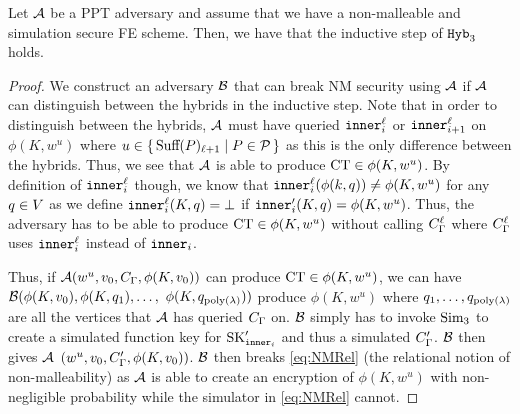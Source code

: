 \begin{lemma}
		\label{lem:NMIndep}
		Let $\mathcal{A}$ be a PPT adversary and assume that we have a non-malleable and simulation secure
		FE scheme. Then, we have that the inductive step of $\texttt{Hyb}_3$ holds.
		\begin{proof}
			We construct an adversary $\mathcal{B}$ that can break NM security using $\mathcal{A}$ if $\mathcal{A}$ can distinguish between the hybrids
			in the inductive step.
			Note that in order to distinguish between the hybrids, $\mathcal{A}$ must have queried $\texttt{inner}^\ell_i$ or $\texttt{inner}^\ell_{i + 1}$ on $\phi(K, w^u)$ where $u \in \set{\text{Suff}(P)_{\ell + 1} \mid P \in \mathcal{P}}$
			as this is the only difference between the hybrids.
			Thus, we see that $\mathcal{A}$ is able to produce $\text{CT} \in \phi(K, w^u)$.
			By definition of $\texttt{inner}_i^\ell$ though, we know that $\texttt{inner}_i^\ell(\phi(k, q)) \neq \phi(K, w^u)$
			for any $q \in V$ as we define $\texttt{inner}_i^\ell(K, q) = \bot$ if $\texttt{inner}_i'(K, q) = \phi(K, w^u)$.
			Thus, the adversary has to be able to produce $\text{CT} \in \phi(K, w^u)$ without calling $C_\Gamma^\ell$
			where $C_\Gamma^\ell$ uses $\texttt{inner}_i^\ell$ instead of $\texttt{inner}_i$.

			Thus, if $\mathcal{A}(w^u, v_0, C_\Gamma, \phi(K, v_0))$ can produce $\text{CT} \in \phi(K, w^u)$,
			we can have $\mathcal{B}(\phi(K, v_0), \phi(K, q_1), \dots,$ $ \phi(K,q_{\operatorname{poly}(\lambda)}))$ 
			produce $\phi(K, w^u)$ where $q_1, \dots, q_{\operatorname{poly}(\lambda)}$ are all the vertices that $\mathcal{A}$ has queried $C_\Gamma$ on.
			$\mathcal{B}$ simply has to invoke $\text{Sim}_3$ to create a simulated function key for $\text{SK}_{\texttt{inner}_i}'$
			and thus a simulated $C_\Gamma'$.
			$\mathcal{B}$ then gives $\mathcal{A}$ $(w^u, v_0, C_\Gamma', \phi(K, v_0))$.
			$\mathcal{B}$ then breaks \cref{eq:NMRel} (the relational notion of non-malleability) as $\mathcal{A}$ is able to create an encryption of $\phi(K, w^u)$ with non-negligible probability while the simulator 
			in \cref{eq:NMRel} cannot.
		\end{proof}
\end{lemma}

